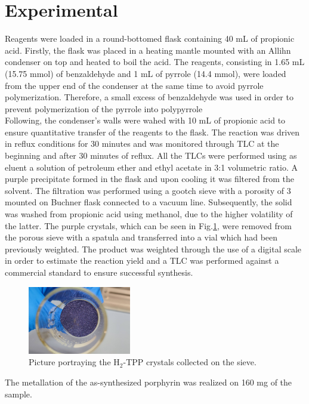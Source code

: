 \documentclass[twoside,twocolumn,9pt]{article}
\begin{document}
\section{Experimental}
Reagents were loaded in a round-bottomed flask containing 40 mL of propionic acid.
Firstly, the flask was placed in a heating mantle mounted with an Allihn condenser on top and heated to boil the acid.
The reagents, consisting in 1.65 mL (15.75 mmol) of benzaldehyde and 1 mL of pyrrole (14.4 mmol), were loaded from the upper end of the condenser at the same time to avoid pyrrole polymerization.
Therefore, a small excess of benzaldehyde was used in order to prevent polymerization of the pyrrole into polypyrrole \\
Following, the condenser's walls were wahed with 10 mL of propionic acid to ensure quantitative transfer of the reagents to the flask.
The reaction was driven in reflux conditions for 30 minutes and was monitored through TLC at the beginning and after 30 minutes of reflux.
All the TLCs were performed using as eluent a solution of petroleum ether and ethyl acetate in 3:1 volumetric ratio.
A purple precipitate formed in the flask and upon cooling it was filtered from the solvent.
The filtration was performed using a gootch sieve with a porosity of 3 mounted on Buchner flask connected to a vacuum line.
Subsequently, the solid was washed from propionic acid using methanol, due to the higher volatility of the latter.
The purple crystals, which can be seen in Fig.\ref{pic-tpp}, were removed from the porous sieve with a spatula and transferred into a vial which had been previously weighted.
The product was weighted through the use of a digital scale in order to estimate the reaction yield and a TLC was performed against a commercial standard to ensure successful synthesis.\\
\begin{figure}[h]
	\centering
	\includegraphics[width=0.4\textwidth]{photo-tpp}
	\caption{Picture portraying the H$_{2}$-TPP crystals collected on the sieve.}
	\label{pic-tpp}
\end{figure}
\break
The metallation of the as-synthesized porphyrin was realized on 160 mg of the sample.
\end{document}
